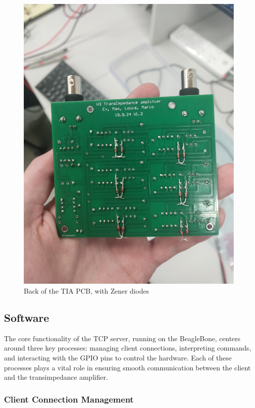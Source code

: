 \documentclass[conference]{IEEEtran}
\begin{document}
\begin{figure}
    \centering
    \includegraphics[width=\linewidth]{TIA_PCB_backpic.jpg}
    \caption{Back of the TIA PCB, with Zener diodes}
    \label{fig:7.5}
\end{figure}

\subsection{Software}

The core functionality of the TCP server, running on the BeagleBone, centers around three key processes: managing client connections, interpreting commands, and interacting with the GPIO pins to control the hardware. Each of these processes plays a vital role in ensuring smooth communication between the client and the transimpedance amplifier.\\


\subsubsection{Client Connection Management}
\end{document}
